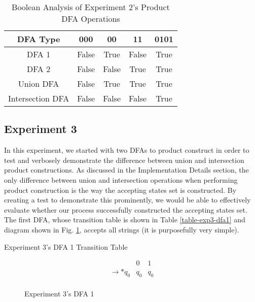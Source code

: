 \documentclass[conference]{IEEEtran}
\begin{document}
\begin{table}[h!]
\centering
\caption{Boolean Analysis of Experiment 2's Product DFA Operations}
\label{table-exp2-dfabool}
\begin{tabular}{|c|c|c|c|c|}
\hline
\textbf{DFA Type} & \textbf{000} & \textbf{00} & \textbf{11} & \textbf{0101} \\ \hline
DFA 1 & False & True & False & True \\ \hline
DFA 2 & False & False & True & True \\ \hline
Union DFA & False & True & True & True \\ \hline
Intersection DFA & False & False & False & True \\ \hline
\end{tabular}
\end{table} 

\subsection{Experiment 3}
In this experiment, we started with two DFAs to product construct in order to test and verbosely demonstrate the difference between union and intersection product constructions. As discussed in the Implementation Details section, the only difference between union and intersection operations when performing product construction is the way the accepting states set is constructed. By creating a test to demonstrate this prominently, we would be able to effectively evaluate whether our process successfully constructed the accepting states set. The first DFA, whose transition table is shown in Table \ref{table-exp3-dfa1} and diagram shown in Fig. \ref{fig-exp3-dfa1}, accepts all strings (it is purposefully very simple).

\begin{table}[h!]
    \caption{Experiment 3's DFA 1 Transition Table}
    \begin{displaymath}
        \begin{array}{r|c|c|}
        & 0 & 1 \\
        \hline
        \rightarrow * q_0 & q_0 & q_0 \\
        \end{array}
    \end{displaymath}
    \label{table-exp3-dfa1}
\end{table}
\begin{figure}[h!]
    \centering
    \caption{Experiment 3's DFA 1}
    \label{fig-exp3-dfa1}
\end{figure}
\end{document}
